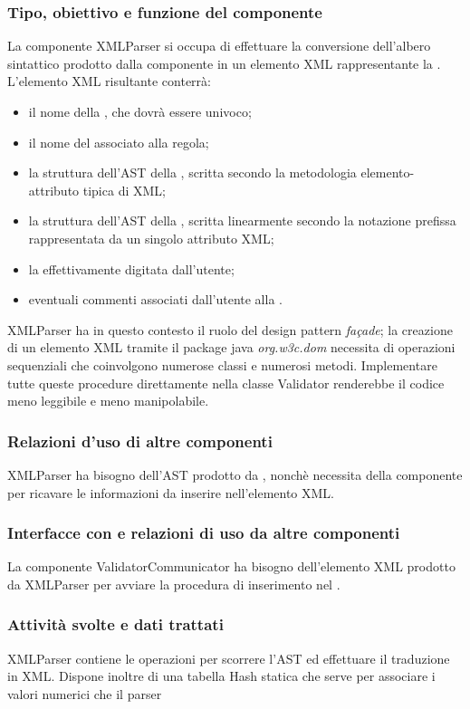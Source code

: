 \documentclass[11pt,titlepage,a4paper]{report}
\begin{document}
\subsubsection{Tipo, obiettivo e funzione del componente}
La componente XMLParser si occupa di effettuare la conversione dell'albero sintattico prodotto dalla componente \brp in un elemento XML rappresentante la \br. L'elemento XML risultante conterr\`a:
\begin{itemize}
 \item il nome della \br, che dovr\`a essere univoco;
 \item il nome del \bo associato alla regola;
 \item la struttura dell'AST della \br, scritta secondo la metodologia elemento-attributo tipica di XML;
 \item la struttura dell'AST della \br, scritta linearmente secondo la notazione prefissa rappresentata da un singolo attributo XML;
 \item la \br effettivamente digitata dall'utente;
 \item eventuali commenti associati dall'utente alla \br.
\end{itemize}
XMLParser ha in questo contesto il ruolo del design pattern \textit{fa\c{c}ade}; la creazione di un elemento XML tramite il package java \textit{org.w3c.dom} necessita di operazioni sequenziali che coinvolgono numerose classi e numerosi metodi. Implementare tutte queste procedure direttamente nella classe Validator renderebbe il codice meno leggibile e meno manipolabile.
\subsubsection{Relazioni d'uso di altre componenti}
XMLParser ha bisogno dell'AST prodotto da \brp, nonch\`e necessita della componente \br per ricavare le informazioni da inserire nell'elemento XML.
\subsubsection{Interfacce con e relazioni di uso da altre componenti}
La componente ValidatorCommunicator ha bisogno dell'elemento XML prodotto da XMLParser per avviare la procedura di inserimento nel \re.
\subsubsection{Attivit\`a svolte e dati trattati}
XMLParser contiene le operazioni per scorrere l'AST ed effettuare il traduzione in XML. Dispone inoltre di una tabella Hash statica che serve per associare i valori numerici che il parser 
\end{document}
